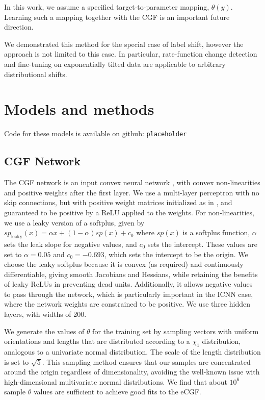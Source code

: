 \documentclass{article}      %
\begin{document}
In this work, we assume a specified target-to-parameter mapping, $\theta(y)$.
Learning such a mapping together with the CGF is an important future direction.


We demonstrated this method for the special case of label shift, however the approach is not limited to this case.
In particular, rate-function change detection and fine-tuning on exponentially tilted data are applicable to arbitrary distributional shifts.



\section{Models and methods}

Code for these models is available on github: \texttt{placeholder}

\subsection{CGF Network} \label{sec:network_architecture}

The CGF network is an input convex neural network \cite{amos_input_2017}, with convex non-linearities and positive weights after the first layer.
We use a multi-layer perceptron with no skip connections, but with positive weight matrices initialized as in \cite{hoedt_principled_2023}, and guaranteed to be positive by a ReLU applied to the weights.
For non-linearities, we use a leaky version of a softplus, given by $sp_{\textrm{leaky}}(x) = \alpha x + (1 - \alpha) sp(x) + c_0$ where $sp(x)$ is a softplus function, $\alpha$ sets the leak slope for negative values, and $c_0$ sets the intercept. 
These values are set to $\alpha =0.05$ and $c_0 = -0.693$, which sets the intercept to be the origin.
We choose the leaky softplus because it is convex (as required) and continuously differentiable, giving smooth Jacobians and Hessians, while retaining the benefits of leaky ReLUs in preventing dead units.
Additionally, it allows negative values to pass through the network, which is particularly important in the ICNN case, where the network weights are constrained to be positive.
We use three hidden layers, with widths of 200.

We generate the values of $\theta$ for the training set by sampling vectors with uniform orientations and lengths that are distributed according to a $\chi_1$ distribution, analogous to a univariate normal distribution.
The scale of the length distribution is set to $\sqrt{5}$.
This sampling method ensures that our samples are concentrated around the origin regardless of dimensionality, avoiding the well-known issue with high-dimensional multivariate normal distributions.
We find that about $10^6$ sample $\theta$ values are sufficient to achieve good fits to the eCGF.
\end{document}
